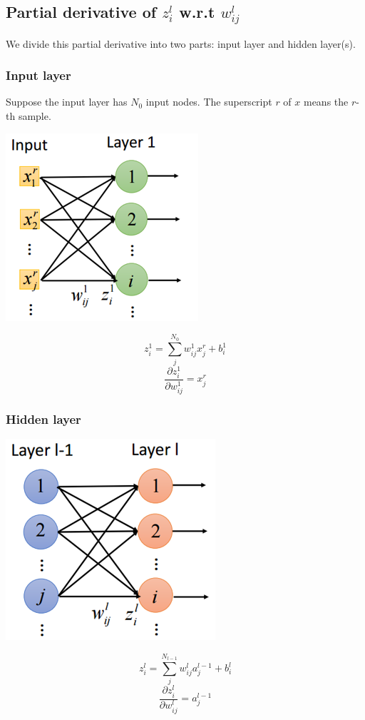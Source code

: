 \documentclass{article}
\begin{document}
\subsection{Partial derivative of $z^l_i$ w.r.t $w^l_{ij}$}
We divide this partial derivative into two parts: input layer and hidden layer(s).

\subsubsection{Input layer}
Suppose the input layer has $N_0$ input nodes. The superscript $r$ of $x$ means the $r$-th sample.
\begin{center}
\includegraphics[scale=0.5]{grad_ztow_input}
\end{center}
\[
z^1_i = \sum_j^{N_0}w^1_{ij}x^r_j + b^1_i
\]
\[
\frac{\partial z^1_i}{\partial w^1_{ij}} = x^r_j
\]

\subsubsection{Hidden layer}
\begin{center}
\includegraphics[scale=0.5]{grad_ztow_hidden}
\end{center}
\[
z^l_i = \sum_j^{N_{l-1}}w^l_{ij}a^{l-1}_j + b^l_i
\]
\[
\frac{\partial z^l_i}{\partial w^l_{ij}} = a^{l-1}_j
\]
\end{document}
